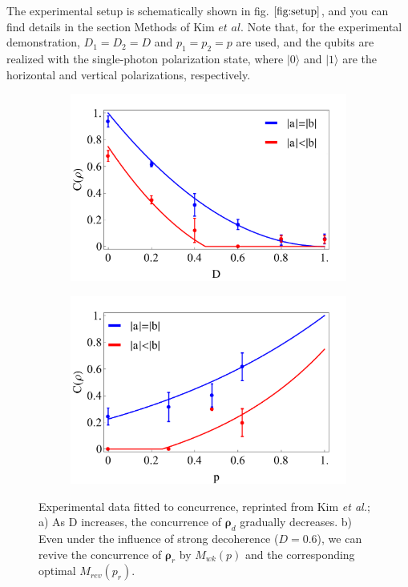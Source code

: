 \documentclass[%
 reprint,
 amsmath,amssymb,
 aps,
]{revtex4-1}
\begin{document}
The experimental setup is schematically shown in fig. $\ref{fig:setup}$, and you can find details in the section Methods of Kim $\textit{et al.}$ Note that, for the experimental demonstration, $D_1=D_2=D$ and $p_1=p_2=p$ are used, and the qubits are realized with the single-photon polarization state, where $|0\rangle$ and $|1\rangle$ are the horizontal and vertical polarizations, respectively.

\begin{figure}
        \centering
        \begin{subfigure}[b]{0.49\textwidth}
                \includegraphics[width=\textwidth]{concd}
                \caption{}
                \label{fig:concd}
        \end{subfigure}
        \vfill
        \begin{subfigure}[b]{0.49\textwidth}
                \includegraphics[width=\textwidth]{concw}
                \caption{}
                \label{fig:concw}
        \end{subfigure}
        \caption{Experimental data fitted to concurrence, reprinted from Kim \textit{et al.}; a) As D increases, the concurrence of $\boldsymbol{\rho}_d$ gradually decreases. b) Even under the influence of strong decoherence ($D=0.6$), we can revive the concurrence of $\boldsymbol{\rho}_r$ by $M_{wk}(p)$ and the corresponding optimal $M_{rev}(p_r)$.}\label{fig:conc}
\end{figure}
\end{document}
